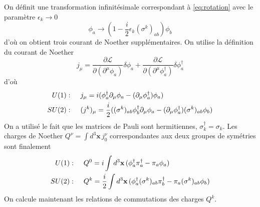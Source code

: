 \documentclass{article}
\numberwithin{equation}{section}
\begin{document}
On définit une transformation infinitésimale correspondant à \eqref{eq:rotation} avec le paramètre $\epsilon_{k} \rightarrow 0$
\begin{equation}
        \phi_a \rightarrow (1 - \frac{i}{2}\epsilon_{k} (\sigma^k)_{ab} )\phi_b
\end{equation} 
d'où on obtient trois courant de Noether supplémentaires. On utilise la définition du courant de Noether
\begin{equation}
        j_\mu = \frac{\partial \mathcal{L}}{\partial (\partial^\mu \phi_a)} \delta\phi_a + \frac{\partial \mathcal{L}}{\partial (\partial^{\mu} \phi^{\dagger}_a)}\delta \phi^{\dagger}_a  
\end{equation} 
d'où
\begin{align}
        U(1):&\hspace{.5cm} j_\mu = i(\phi_a^{\dagger}\partial_\mu \phi_a - (\partial_\mu \phi^{\dagger}_a) \phi_a) \\
        SU(2):&\hspace{.5cm} (j^{k})_\mu = \frac{i}{2} ((\sigma^{k})_{ab}\phi_b^{\dagger}\partial_\mu \phi_a - (\partial_\mu \phi^{\dagger}_a) (\sigma^{k})_{ab}\phi_b) 
\end{align}
On a utilisé le fait que les matrices de Pauli sont hermitiennes, $\sigma_k^{\dagger} = \sigma_k$. 
Les charges de Noether $Q^{\nu} = \int d^{3}\mathbf{x}\, j_0^{\nu}$ correspondantes aux deux groupes de symétries sont finalement
\begin{align}
        U(1):&\hspace{.5cm} Q^{0} =  i\int d^{3}\mathbf{x}\,  (\phi_a^{\dagger} \pi_a^{\dagger} - \pi_a \phi_a)\\
        SU(2):&\hspace{.5cm} Q^{k} = \frac{i}{2}\int d^{3}\mathbf{x}\, (\phi_a^{\dagger}(\sigma^{k})_{ab}\pi^{\dagger}_b -  \pi_a (\sigma^{k})_{ab}\phi_b) 
\end{align}
On calcule maintenant les relations de commutations des charges $Q^{k}$. 
\begingroup
\allowdisplaybreaks
\end{document}
